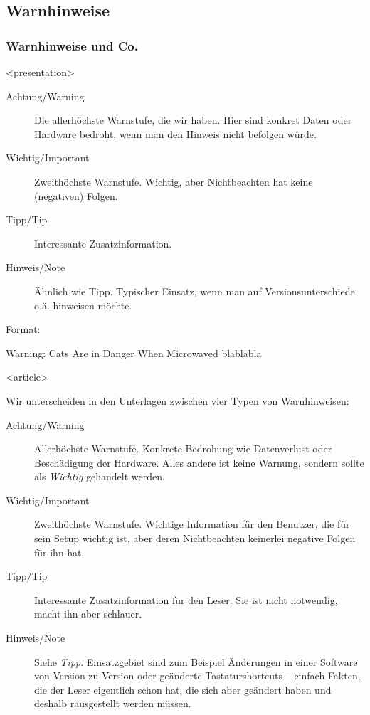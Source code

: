 \subsection{Warnhinweise}
\begin{frame}[fragile]
\frametitle<presentation>{Warnhinweise und Co.}




\mode
<presentation>
\begin{description}
 \item[Achtung/Warning] Die allerhöchste Warnstufe, die wir haben. Hier sind konkret Daten oder Hardware bedroht, wenn man den Hinweis nicht befolgen würde.
 \item[Wichtig/Important] Zweithöchste Warnstufe. Wichtig, aber Nichtbeachten hat keine (negativen) Folgen.
 \item[Tipp/Tip] Interessante Zusatzinformation.
 \item[Hinweis/Note] Ähnlich wie Tipp. Typischer Einsatz, wenn man auf Versionsunterschiede o.ä. hinweisen möchte.
\end{description}

Format:
\begin{block}{Warning: Cats Are in Danger When Microwaved}
 blablabla
\end{block}

\mode
<article>

Wir unterscheiden in den Unterlagen zwischen vier Typen von Warnhinweisen:

\begin{description}
 \item[Achtung/Warning] Allerhöchste Warnstufe. Konkrete Bedrohung wie Datenverlust oder Beschädigung der Hardware. Alles andere ist keine Warnung, sondern sollte als \textit{Wichtig} gehandelt werden.
 \item[Wichtig/Important] Zweithöchste Warnstufe. Wichtige Information für den Benutzer, die für sein Setup wichtig ist, aber deren Nichtbeachten keinerlei negative Folgen für ihn hat.
 \item[Tipp/Tip] Interessante Zusatzinformation für den Leser. Sie ist nicht notwendig, macht ihn aber schlauer.
 \item[Hinweis/Note] Siehe \textit{Tipp}. Einsatzgebiet sind zum Beispiel Änderungen in einer Software von Version zu Version oder geänderte Tastaturshortcuts -- einfach Fakten, die der Leser eigentlich schon hat, die sich aber geändert haben und deshalb rausgestellt werden müssen.
\end{description}


\end{frame}
